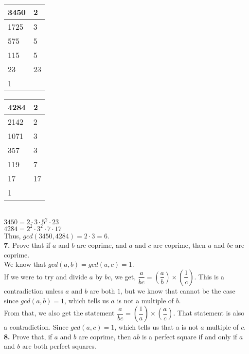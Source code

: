 \documentclass[paper=letter, fontsize=11pt]{scrartcl} %
\begin{document}
\begin{tabular}{|l|l|}
\hline
3450 & 2  \\ \hline
1725 & 3  \\ \hline
575  & 5  \\ \hline
115  & 5  \\ \hline
23   & 23 \\ \hline
1    &    \\ \hline
\end{tabular}
\begin{tabular}{|l|l|}
\hline
4284 & 2  \\ \hline
2142 & 2  \\ \hline
1071 & 3  \\ \hline
357  & 3  \\ \hline
119  & 7  \\ \hline
17   & 17 \\ \hline
1    &    \\ \hline
\end{tabular}
\\

$3450 = 2 \cdot 3 \cdot 5^2 \cdot 23$ \\
$4284 = 2^2 \cdot 3^2 \cdot 7 \cdot 17$ \\

Thus, $gcd(3450,4284) = 2 \cdot 3 = 6$.
\\

\textbf{7.} Prove that if $a$ and $b$ are coprime, and $a$ and $c$ are coprime, then $a$
and $bc$ are coprime.
\\

We know that $gcd(a,b) = gcd(a,c) = 1$. \\
If we were to try and divide $a$ by $bc$, we get, $\dfrac{a}{bc} = (\dfrac{a}{b}) \times
(\dfrac{1}{c})$. This is a contradiction unless $a$ and $b$ are both $1$, but we know that
cannot be the case since $gcd(a,b) = 1$, which tells us $a$ is not a multiple of $b$. \\

From that, we also get the statement $\dfrac{a}{bc} = (\dfrac{1}{a}) \times (\dfrac{a}{c})$.
That statement is also a contradiction. Since $gcd(a,c) = 1$, which tells us that a is not 
$a$ multiple of $c$.
\\

\textbf{8.} Prove that, if $a$ and $b$ are coprime, then $ab$ is a perfect square if and
only if $a$ and $b$ are both perfect squares.
\\
\end{document}
